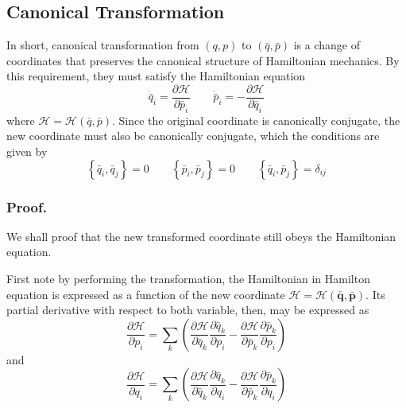 \documentclass[../../../main.tex]{subfiles}
\begin{document}
\subsection*{Canonical Transformation}
In short, canonical transformation from $(q,p)$ to $(\bar{q}, \bar{p})$ is a change of coordinates that preserves the canonical structure of Hamiltonian mechanics.
By this requirement, they must satisfy the Hamiltonian equation
\begin{equation*}
	\dot{\bar{q }}_i=\frac{\partial \mathcal{H }}{\partial \bar{p}_i}\qquad \dot{\bar{p }}_i=-\frac{\partial \mathcal{H }}{\partial \bar{q }_i}
\end{equation*}
where $\mathcal{H }=\mathcal{H}(\bar{q },\bar{p})$.
Since the original coordinate is canonically conjugate, the new coordinate must also be canonically conjugate, which the conditions are given by
\begin{equation*}
	\left\{ \bar{q}_i,\bar{q }_j  \right\}=0\qquad \left\{ \bar{p}_i,\bar{p}_j  \right\}=0\qquad \left\{ \bar{q}_i,\bar{p}_j  \right\}=\delta_{ij}
\end{equation*}

\subsubsection*{Proof.}
We shall proof that the new transformed coordinate still obeys the Hamiltonian equation.

First note by performing the transformation, the Hamiltonian in Hamilton equation is expressed as a function of the new coordinate $\mathcal{H }=\mathcal{H }(\mathbf{\bar{q} },\mathbf{\bar{p} })$.
Its partial derivative with respect to both variable, then, may be expressed as
\begin{equation*}
	\frac{\partial \mathcal{H }}{\partial p_i }=
	\sum_k \left( \frac{\partial \mathcal{H }}{\partial \bar{q }_k }\frac{\partial \bar{q }_k }{\partial p_i }-\frac{\partial \mathcal{H }}{\partial \bar{p }_k }\frac{\partial \bar{p }_k }{\partial p_i } \right)
\end{equation*}
and
\begin{equation*}
	\frac{\partial \mathcal{H }}{\partial q_i}=
	\sum_k \left( \frac{\partial \mathcal{H }}{\partial \bar{q }_k }\frac{\partial \bar{q }_k }{\partial q_i }-\frac{\partial \mathcal{H }}{\partial \bar{p }_k }\frac{\partial \bar{p }_k }{\partial q_i } \right)
\end{equation*}
\end{document}
